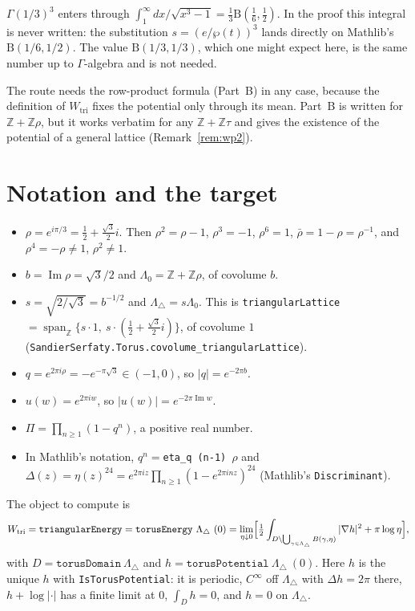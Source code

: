 \documentclass[11pt]{article}
\theoremstyle{definition}
\theoremstyle{remark}
\newcommand{\Z}{\mathbb Z}
\newcommand{\LamO}{\Lambda_0}
\newcommand{\Ltri}{\Lambda_{\triangle}}
\newcommand{\lean}[1]{\texttt{#1}}
\DeclareMathOperator{\Imag}{Im}
\begin{document}
$\Gamma(1/3)^3$ enters through $\int_1^\infty\!dx/\sqrt{x^3-1}=\tfrac13\mathrm B(\tfrac16,\tfrac12)$. In the proof this
integral is never written: the substitution $s=(e/\wp(t))^3$ lands directly on Mathlib's $\mathrm B(1/6,1/2)$.
The value $\mathrm B(1/3,1/3)$, which one might expect here, is the same number up to $\Gamma$-algebra and is not needed.

The route needs the row-product formula (Part~B) in any case, because the definition of $W_{\mathrm{tri}}$
fixes the potential only through its mean. Part~B is written for $\Z+\Z\rho$, but it works verbatim for any
$\Z+\Z\tau$ and gives the existence of the potential of a general lattice (Remark~\ref{rem:wp2}).

\section{Notation and the target}

\begin{itemize}
\item $\rho=e^{i\pi/3}=\tfrac12+\tfrac{\sqrt3}2i$. Then $\rho^2=\rho-1$, $\rho^3=-1$, $\rho^6=1$,
$\bar\rho=1-\rho=\rho^{-1}$, and $\rho^4=-\rho\ne1$, $\rho^2\neq 1$.
\item $b=\Imag\rho=\sqrt3/2$ and $\LamO=\Z+\Z\rho$, of covolume $b$.
\item $s=\sqrt{2/\sqrt3}=b^{-1/2}$ and $\Ltri=s\LamO$. This is \lean{triangularLattice}
$=\operatorname{span}_\Z\{s\cdot1,\ s\cdot(\tfrac12+\tfrac{\sqrt3}2i)\}$, of covolume $1$
(\lean{SandierSerfaty.Torus.covolume\_triangularLattice}).
\item $q=e^{2\pi i\rho}=-e^{-\pi\sqrt3}\in(-1,0)$, so $|q|=e^{-2\pi b}$.
\item $u(w)=e^{2\pi iw}$, so $|u(w)|=e^{-2\pi\Imag w}$.
\item $\Pi=\prod_{n\ge1}(1-q^n)$, a positive real number.
\item In Mathlib's notation, $q^n=$\lean{eta\_q (n-1) $\rho$} and $\Delta(z)=\eta(z)^{24}=e^{2\pi iz}\prod_{n\ge1}(1-e^{2\pi inz})^{24}$
(Mathlib's \lean{Discriminant}).
\end{itemize}

\noindent The object to compute is
\[
 W_{\mathrm{tri}}=\lean{triangularEnergy}=\lean{torusEnergy}\ \Ltri\ (0)
 =\lim_{\eta\downarrow0}\Bigl[\tfrac12\int_{D\setminus\bigcup_{\gamma\in\Ltri}B(\gamma,\eta)}|\nabla h|^2+\pi\log\eta\Bigr],
\]
with $D=\lean{torusDomain}\ \Ltri$ and $h=\lean{torusPotential}\ \Ltri\ (0)$. Here $h$ is the unique $h$ with
\lean{IsTorusPotential}: it is periodic, $C^\infty$ off $\Ltri$ with $\Delta h=2\pi$ there, $h+\log|\cdot|$ has a
finite limit at $0$, $\int_Dh=0$, and $h=0$ on $\Ltri$.
\end{document}
